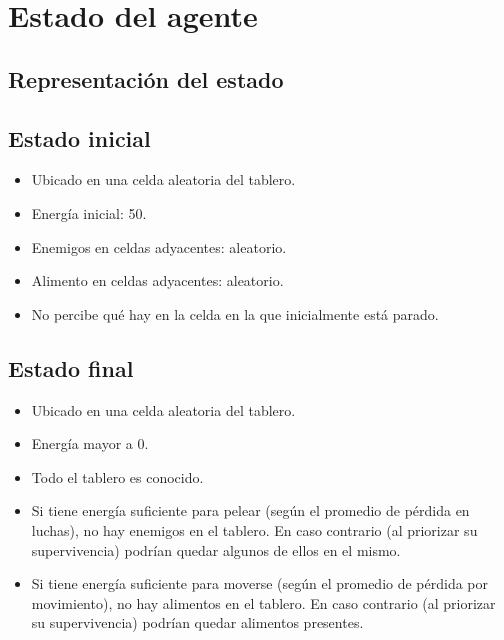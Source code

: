 \section{Estado del agente}

\subsection{Representación del estado}

\subsection{Estado inicial}

\begin{itemize}
\item Ubicado en una celda aleatoria del tablero.
\item Energía inicial: 50.
\item Enemigos en celdas adyacentes: aleatorio.
\item Alimento en celdas adyacentes: aleatorio.
\item No percibe qué hay en la celda en la que inicialmente está parado.
\end{itemize}

\subsection{Estado final}

\begin{itemize}
\item Ubicado en una celda aleatoria del tablero.
\item Energía mayor a 0.
\item Todo el tablero es conocido.
\item Si tiene energía suficiente para pelear (según el promedio de pérdida en
luchas), no hay enemigos en el tablero. En caso contrario (al priorizar su
supervivencia) podrían quedar algunos de ellos en el mismo.
\item Si tiene energía suficiente para moverse (según el promedio de pérdida
por movimiento), no hay alimentos en el tablero. En caso contrario (al priorizar
su supervivencia) podrían quedar alimentos presentes.
\end{itemize}
